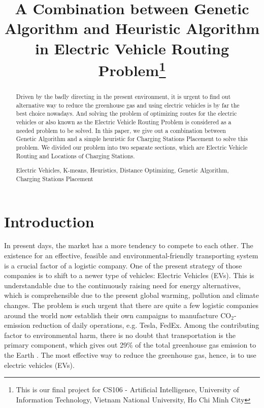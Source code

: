 \documentclass[conference,compsoc]{IEEEtran}
\begin{document}
\title{A Combination between Genetic Algorithm and Heuristic Algorithm\\ in Electric Vehicle Routing Problem\footnote[1]{This is our final project for CS106 - Artificial Intelligence, University of Information Technology, Vietnam National University, Ho Chi Minh City}}


\author{
}
\maketitle

\begin{abstract}
Driven by the badly directing in the present environment, it is urgent to find out alternative way to reduce the greenhouse gas and using electric vehicles is by far the best choice nowadays. And solving the problem of optimizing routes for the electric vehicles or also known as the Electric Vehicle Routing Problem is considered as a needed problem to be solved. In this paper, we give out a combination between Genetic Algorithm and a simple heuristic for Charging Stations Placement to solve this problem. We divided our problem into two separate sections, which are Electric Vehicle Routing and Locations of Charging Stations.
\begin{IEEEkeywords}
Electric Vehicles, K-means, Heuristics, Distance Optimizing, Genetic Algorithm, Charging Stations Placement
\end{IEEEkeywords}
\end{abstract}

\IEEEpeerreviewmaketitle
\section{Introduction}In present days, the market has a more tendency to compete to each other. The existence for an effective, feasible and environmental-friendly transporting system is a crucial factor of a logistic company. One of the present strategy of those companies is to shift to a newer type of vehicles: Electric Vehicles (EVs). This is understandable due to the continuously raising need for energy alternatives, which is comprehensible due to the present global warming, pollution and climate changes. The problem is such urgent that there are quite a few logistic companies around the world now establish their own campaigns to manufacture CO$_2$-emission reduction of daily operations, e.g. Tesla, FedEx. Among the contributing factor to environmental harm, there is no doubt that transportation is the primary component, which gives out 29\% of the total greenhouse gas emission to the Earth \cite{transportation}. The most effective way to reduce the greenhouse gas, hence, is to use electric vehicles (EVs).\\
\end{document}
